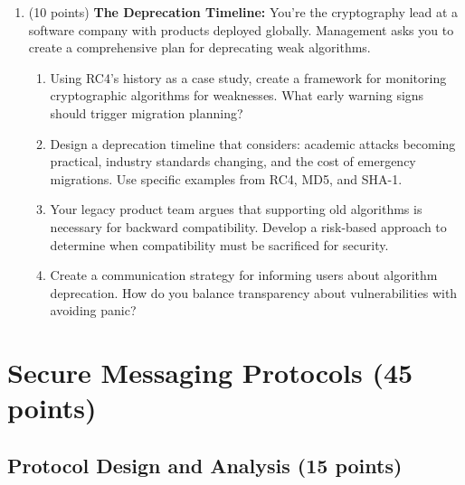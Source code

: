 \documentclass[10pt,a4paper,american]{exam}
\begin{document}
\begin{enumerate}
	\item (10 points) \textbf{The Deprecation Timeline:}
	      You're the cryptography lead at a software company with products deployed globally. Management asks you to create a comprehensive plan for deprecating weak algorithms.
	      \begin{enumerate}
		      \item Using RC4's history as a case study, create a framework for monitoring cryptographic algorithms for weaknesses. What early warning signs should trigger migration planning?
		      \item Design a deprecation timeline that considers: academic attacks becoming practical, industry standards changing, and the cost of emergency migrations. Use specific examples from RC4, MD5, and SHA-1.
		      \item Your legacy product team argues that supporting old algorithms is necessary for backward compatibility. Develop a risk-based approach to determine when compatibility must be sacrificed for security.
		      \item Create a communication strategy for informing users about algorithm deprecation. How do you balance transparency about vulnerabilities with avoiding panic?
	      \end{enumerate}
\end{enumerate}

\section{Secure Messaging Protocols (45 points)}

\subsection{Protocol Design and Analysis (15 points)}
\end{document}
